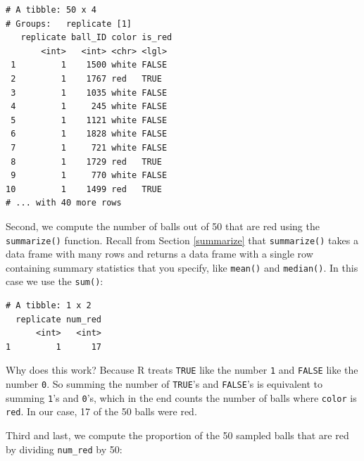 \documentclass[12pt, krantz2,]{krantz}
\makeatletter
\newenvironment{Shaded}{\begin{snugshade}}{\end{snugshade}}
\newcommand{\DataTypeTok}[1]{\textcolor[rgb]{0.27,0.27,0.27}{#1}}
\newcommand{\DecValTok}[1]{\textcolor[rgb]{0.06,0.06,0.06}{#1}}
\newcommand{\KeywordTok}[1]{\textcolor[rgb]{0.27,0.27,0.27}{\textbf{#1}}}
\newcommand{\NormalTok}[1]{#1}
\newcommand{\OperatorTok}[1]{\textcolor[rgb]{0.43,0.43,0.43}{\textbf{#1}}}
\newcommand{\StringTok}[1]{\textcolor[rgb]{0.5,0.5,0.5}{#1}}
\newenvironment{kframe}{%
\medskip{}
\setlength{\fboxsep}{.8em}
 \def\at@end@of@kframe{}%
 \ifinner\ifhmode%
  \def\at@end@of@kframe{\end{minipage}}%
  \begin{minipage}{\columnwidth}%
 \fi\fi%
 \def\FrameCommand##1{\hskip\@totalleftmargin \hskip-\fboxsep
 \colorbox{shadecolor}{##1}\hskip-\fboxsep
     \hskip-\linewidth \hskip-\@totalleftmargin \hskip\columnwidth}%
 \MakeFramed {\advance\hsize-\width
   \@totalleftmargin\z@ \linewidth\hsize
   \@setminipage}}%
 {\par\unskip\endMakeFramed%
 \at@end@of@kframe}
\renewenvironment{Shaded}{\begin{kframe}}{\end{kframe}}
\makeatother
\begin{document}
\begin{verbatim}
# A tibble: 50 x 4
# Groups:   replicate [1]
   replicate ball_ID color is_red
       <int>   <int> <chr> <lgl> 
 1         1    1500 white FALSE 
 2         1    1767 red   TRUE  
 3         1    1035 white FALSE 
 4         1     245 white FALSE 
 5         1    1121 white FALSE 
 6         1    1828 white FALSE 
 7         1     721 white FALSE 
 8         1    1729 red   TRUE  
 9         1     770 white FALSE 
10         1    1499 red   TRUE  
# ... with 40 more rows
\end{verbatim}

Second, we compute the number of balls out of 50 that are red using the \texttt{summarize()} function. Recall from Section \ref{summarize} that \texttt{summarize()} takes a data frame with many rows and returns a data frame with a single row containing summary statistics that you specify, like \texttt{mean()} and \texttt{median()}. In this case we use the \texttt{sum()}:

\begin{Shaded}
\end{Shaded}

\begin{verbatim}
# A tibble: 1 x 2
  replicate num_red
      <int>   <int>
1         1      17
\end{verbatim}

Why does this work? Because R treats \texttt{TRUE} like the number \texttt{1} and \texttt{FALSE} like the number \texttt{0}. So summing the number of \texttt{TRUE}'s and \texttt{FALSE}'s is equivalent to summing \texttt{1}'s and \texttt{0}'s, which in the end counts the number of balls where \texttt{color} is \texttt{red}. In our case, 17 of the 50 balls were red.

Third and last, we compute the proportion of the 50 sampled balls that are red by dividing \texttt{num\_red} by 50:

\begin{Shaded}
\end{Shaded}
\end{document}
